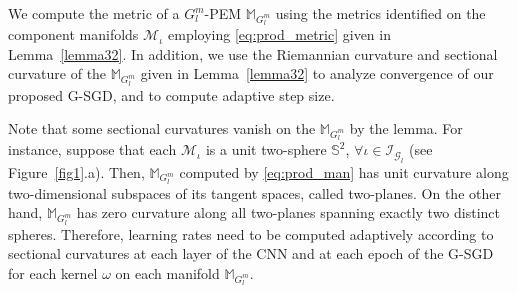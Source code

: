 \documentclass[10pt,journal,compsoc]{IEEEtran}
\theoremstyle{definition}
\theoremstyle{definition}
\theoremstyle{remark}
\theoremstyle{remark}
\theoremstyle{remark}
\begin{document}






We compute the metric of a $G^m_l$-PEM $\mathbb{M}_{G^m_l}$ using the metrics identified on the component manifolds $\mathcal{M}_{\iota}$ employing \eqref{eq:prod_metric} given in Lemma~\ref{lemma32}. In addition, we use the Riemannian curvature and sectional curvature of the $\mathbb{M}_{G^m_l}$ given in Lemma~\ref{lemma32} to analyze convergence of our proposed G-SGD, and to compute adaptive step size. 

Note that some sectional curvatures vanish on the $\mathbb{M}_{G^m_l}$ by the lemma. For instance, suppose that each $\mathcal{M}_{\iota}$ is a unit two-sphere $\mathbb{S}^2$, $\forall \iota \in \mathcal{I}_{\mathcal{G}_l}$ (see Figure~\ref{fig1}.a). Then, $\mathbb{M}_{G^m_l}$ computed by \eqref{eq:prod_man} has unit curvature along two-dimensional subspaces of its tangent spaces, called two-planes. On the other hand, $\mathbb{M}_{G^m_l}$ has  zero curvature along all two-planes spanning exactly two distinct spheres. Therefore, learning rates need to be computed adaptively according to sectional curvatures at each layer of the CNN and at each epoch of the G-SGD for each kernel $\omega$ on each manifold $\mathbb{M}_{G^m_l}$. %
\end{document}
